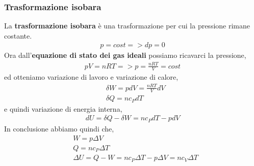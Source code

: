             \subsubsection{Trasformazione isobara}
                La \textbf{trasformazione isobara} è una trasformazione per cui la pressione rimane costante.
                \begin{align*}
                    p = cost => dp = 0
                \end{align*}
                Ora dall'\textbf{equazione di stato dei gas ideali} possiamo ricavarci la pressione,
                \begin{align*}
                    pV=nRT => p = \frac{nRT}{V} = cost
                \end{align*}
                ed otteniamo variazione di lavoro e variazione di calore,
                \begin{align*}
                    &\delta W=pdV = \frac{nRT}{V}dV\\
                    &\delta Q = nc_PdT
                \end{align*}
                e quindi variazione di energia interna,
                \begin{align*}
                    dU=\delta Q - \delta W=nc_PdT-pdV
                \end{align*}
                In conclusione abbiamo quindi che,
                \begin{align*}
                    &W=p\Delta V\\
                    &Q = nc_P\Delta T\\
                    &\Delta U=Q - W=nc_P\Delta T-p\Delta V=nc_V\Delta T
                \end{align*}

